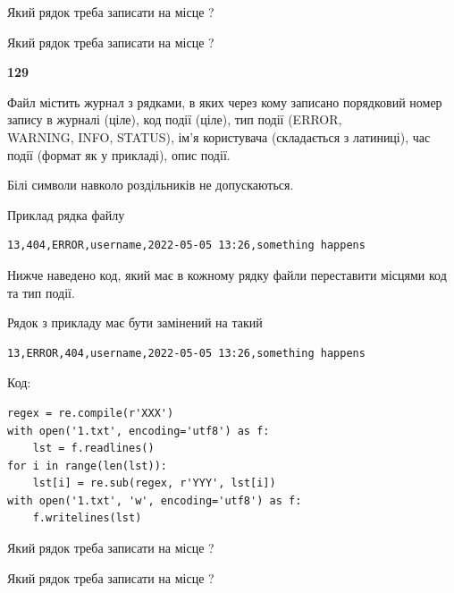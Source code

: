 Який рядок треба записати на місце  ?\par
\vspace{5mm}


Який рядок треба записати на місце  ?\par


\newpage

{\begin {center}\textbf{ 129}\end {center}}\par
Файл  містить журнал з рядками, в яких через кому записано поряд\-ко\-вий номер запису в журналі (ціле), код події (ціле), тип події (ERROR,\\ WARNING, INFO, STATUS), ім'я користувача (складається з латиниці), час події (фор\-мат як у прикладі), опис події.

Білі символи навколо роздільників не допускаються.

Приклад рядка файлу



\begin{verbatim}
13,404,ERROR,username,2022-05-05 13:26,something happens
\end{verbatim}


Нижче наведено код, який має в кожному рядку файли переставити місцями код та тип події.

Рядок з прикладу має бути замінений на такий



\begin{verbatim}
13,ERROR,404,username,2022-05-05 13:26,something happens
\end{verbatim}




Код:



\begin{verbatim}
regex = re.compile(r'XXX')
with open('1.txt', encoding='utf8') as f:
    lst = f.readlines()
for i in range(len(lst)):
    lst[i] = re.sub(regex, r'YYY', lst[i])
with open('1.txt', 'w', encoding='utf8') as f:
    f.writelines(lst)
\end{verbatim}







Який рядок треба записати на місце  ?\par
\vspace{5mm}


Який рядок треба записати на місце  ?\par


